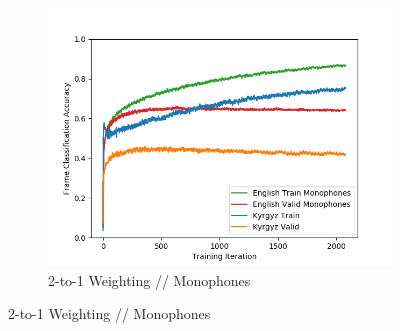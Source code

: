 \documentclass[a4paper]{article}
\begin{document}
\begin{figure}[!htbp]
\begin{subfigure}{.33\textwidth}
  \includegraphics[width=1\textwidth,keepaspectratio]{figs-1/1-to-2-mono.png}
  \caption{2-to-1 Weighting // Monophones}
  \label{fig:sub2}
\end{subfigure}

\medskip


\end{figure}
\end{document}
